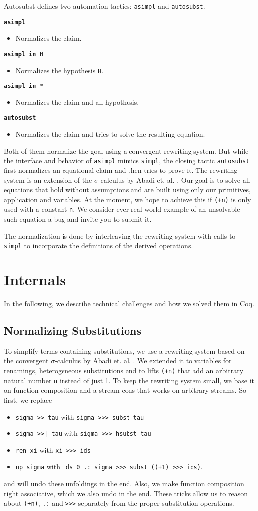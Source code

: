 \documentclass{scrartcl}
\newcommand{\faq}[2]{\vspace{\topsep}\noindent\textbf{#1}\\\vspace{-\topsep}\begin{itemize}[nolistsep]\item[]{#2}\end{itemize}}
\newcommand{\lst}{\lstinline}
\begin{document}
Autosubst defines two automation tactics: \lst$asimpl$ and \lst$autosubst$.

\faq{\lst$asimpl$}{Normalizes the claim.}
\faq{\lst$asimpl in H$}{Normalizes the hypothesis \lst$H$.}
\faq{\lst$asimpl in *$}{Normalizes the claim and all hypothesis.}
\faq{\lst$autosubst$}{Normalizes the claim and tries to solve the resulting equation.}
\vspace{\topsep}

Both of them normalize the goal using a convergent rewriting system.
But while the interface and behavior of \lst$asimpl$ mimics \lst$simpl$, the closing tactic \lst$autosubst$ first normalizes an equational claim and then tries to prove it.
The rewriting system is an extension of the $\sigma$-calculus by Abadi et. al. \cite{abadi1991}.
Our goal is to solve all equations that hold without assumptions and are built using only our primitives, application and variables. At the moment, we hope to achieve this if \lst$(+n)$ is only used with a constant \lst$n$. We consider ever real-world example of an unsolvable such equation a bug and invite you to submit it.



The normalization is done by interleaving the rewriting system with calls to \lst$simpl$ to incorporate the definitions of the derived operations. 


\section{Internals}
\label{sec:internals}

In the following, we describe technical challenges and how we solved them in Coq.

\subsection{Normalizing Substitutions}
\label{sec:norm-subst}

To simplify terms containing substitutions, we use a rewriting system based on the convergent $\sigma$-calculus by Abadi et. al. \cite{abadi1991}. We extended it to variables for renamings, heterogeneous substitutions and to lifts \lst$(+n)$ that add an arbitrary natural number \lst$n$ instead of just 1. To keep the rewriting system small, we base it on function composition and a stream-cons that works on arbitrary streams. So first, we replace
\begin{itemize}
\item \lst$sigma >> tau$ with \lst$sigma >>> subst tau$
\item \lst$sigma >>| tau$ with \lst$sigma >>> hsubst tau$
\item \lst$ren xi$ with \lst$xi >>> ids$
\item \lst$up sigma$ with \lst$ids 0 .: sigma >>> subst ((+1) >>> ids)$.
\end{itemize}
and will undo these unfoldings in the end.
Also, we make function composition right associative, which we also undo in the end.
These tricks allow us to reason about \lst$(+n)$, \lst$.:$ and \lst$>>>$ separately from the proper substitution operations.
\end{document}

